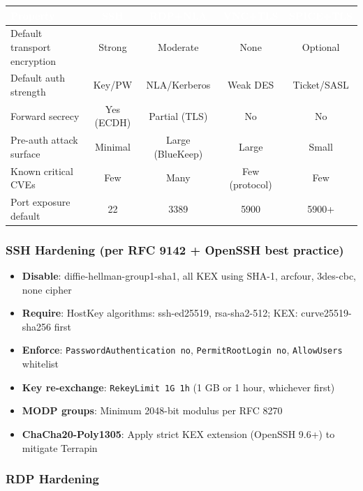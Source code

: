 \documentclass[11pt,letterpaper]{article}
\newcommand{\tableheader}[1]{\textbf{\sffamily\textcolor{white}{#1}}}
\begin{document}
\begin{center}
\begin{tabularx}{\textwidth}{L{2.5cm}CCCC}
\toprule
{}
\tableheader{Property} & \tableheader{SSH} & \tableheader{RDP+NLA} & \tableheader{VNC+TLS} & \tableheader{SPICE+TLS} \\
\midrule
Default transport encryption & Strong & Moderate & None & Optional \\
Default auth strength & Key/PW & NLA/Kerberos & Weak DES & Ticket/SASL \\
Forward secrecy & Yes (ECDH) & Partial (TLS) & No & No \\
Pre-auth attack surface & Minimal & Large (BlueKeep) & Large & Small \\
Known critical CVEs & Few & Many & Few (protocol) & Few \\
Port exposure default & 22 & 3389 & 5900 & 5900+ \\
\bottomrule
\end{tabularx}
\end{center}

\subsubsection{SSH Hardening (per RFC 9142 + OpenSSH best practice)}

\begin{itemize}
\item \textbf{Disable}: diffie-hellman-group1-sha1, all KEX using SHA-1, arcfour, 3des-cbc, none cipher
\item \textbf{Require}: HostKey algorithms: ssh-ed25519, rsa-sha2-512; KEX: curve25519-sha256 first
\item \textbf{Enforce}: \texttt{PasswordAuthentication no}, \texttt{PermitRootLogin no}, \texttt{AllowUsers} whitelist
\item \textbf{Key re-exchange}: \texttt{RekeyLimit 1G 1h} (1 GB or 1 hour, whichever first)
\item \textbf{MODP groups}: Minimum 2048-bit modulus per RFC 8270
\item \textbf{ChaCha20-Poly1305}: Apply strict KEX extension (OpenSSH 9.6+) to mitigate Terrapin
\end{itemize}

\subsubsection{RDP Hardening}
\end{document}
